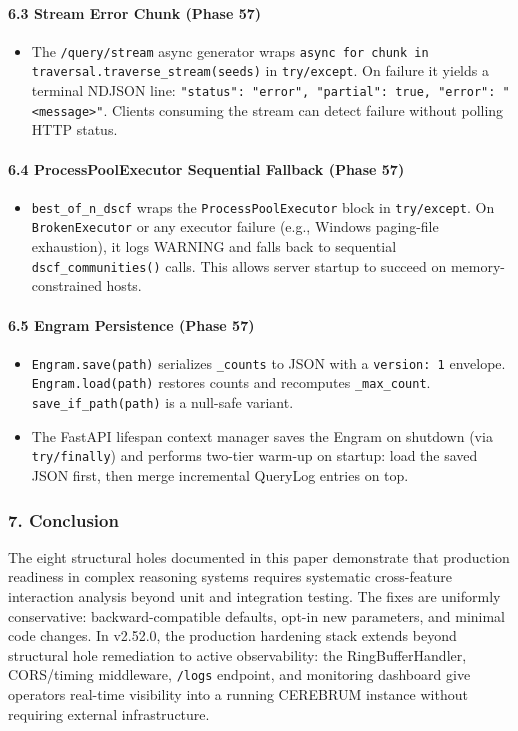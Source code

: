 \paragraph{6.3 Stream Error Chunk (Phase 57)}
\begin{itemize}
\item The \texttt{/query/stream} async generator wraps \texttt{async for chunk in traversal.traverse\_stream(seeds)} in \texttt{try/except}. On failure it yields a terminal NDJSON line: \texttt{{"status": "error", "partial": true, "error": "\textless message\textgreater "}}. Clients consuming the stream can detect failure without polling HTTP status.

\end{itemize}
\paragraph{6.4 ProcessPoolExecutor Sequential Fallback (Phase 57)}
\begin{itemize}
\item \texttt{best\_of\_n\_dscf} wraps the \texttt{ProcessPoolExecutor} block in \texttt{try/except}. On \texttt{BrokenExecutor} or any executor failure (e.g., Windows paging-file exhaustion), it logs WARNING and falls back to sequential \texttt{dscf\_communities()} calls. This allows server startup to succeed on memory-constrained hosts.

\end{itemize}
\paragraph{6.5 Engram Persistence (Phase 57)}
\begin{itemize}
\item \texttt{Engram.save(path)} serializes \texttt{\_counts} to JSON with a \texttt{version: 1} envelope. \texttt{Engram.load(path)} restores counts and recomputes \texttt{\_max\_count}. \texttt{save\_if\_path(path)} is a null-safe variant.
\item The FastAPI lifespan context manager saves the Engram on shutdown (via \texttt{try/finally}) and performs two-tier warm-up on startup: load the saved JSON first, then merge incremental QueryLog entries on top.

\end{itemize}
\subsubsection{7. Conclusion}
The eight structural holes documented in this paper demonstrate that production readiness in complex reasoning systems requires systematic cross-feature interaction analysis beyond unit and integration testing. The fixes are uniformly conse\-rvative: backward-compatible defaults, opt-in new parameters, and minimal code changes. In v2.52.0, the production hardening stack extends beyond structural hole remediation to active obser\-vability: the RingBufferHandler, CORS/timing middleware, \texttt{/logs} endpoint, and monitoring dashboard give operators real-time visibility into a running CEREBRUM instance without requiring external infra\-structure.

